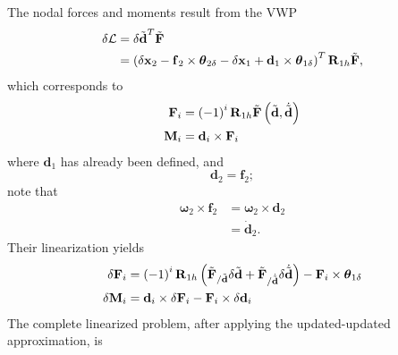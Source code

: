 \documentclass[10pt,dvips,fleqn,subeqn]{report}
\newcommand{\T}[1]{\bm{\mathbf{#1}}}
\begin{document}
The nodal forces and moments result from the VWP
\begin{align}
	\delta\mathcal{L}
	&= \delta \tilde{\T{d}}^T \tilde{\T{F}} \nonumber \\
	&= \plbr{
		\delta{\T{x}}_2
		- \T{f}_2\times\T{\theta}_{2\delta}
		- \delta{\T{x}}_1
		+ \T{d}_1\times\T{\theta}_{1\delta}
	}^T \T{R}_{1h} \tilde{\T{F}} ,
\end{align}
which corresponds to
\begin{subequations}
\begin{align}
	\T{F}_i &= \plbr{ -1 }^i \T{R}_{1h} \tilde{\T{F}}\plbr{\tilde{\T{d}}, \dot{\tilde{\T{d}}}} \\
	\T{M}_i &= \T{d}_i \times \T{F}_i
\end{align}
\end{subequations}
where $\T{d}_1$ has already been defined, and
\begin{equation}
	\T{d}_2 = \T{f}_2 ;
\end{equation}
note that
\begin{align}
	\T{\omega}_2\times\T{f}_2
	&= \T{\omega}_2\times\T{d}_2 \nonumber \\
	&= \dot{\T{d}}_2 .
\end{align}
Their linearization yields
\begin{subequations}
\begin{align}
	\delta\T{F}_i
	&= \plbr{ -1 }^i \T{R}_{1h} \plbr{
		\tilde{\T{F}}_{/\tilde{\T{d}}} \delta{\tilde{\T{d}}}
		+ \tilde{\T{F}}_{/\dot{\tilde{\T{d}}}} \delta\dot{\tilde{\T{d}}}
	} - \T{F}_i \times \T{\theta}_{1\delta} \\
	\delta\T{M}_i
	&= \T{d}_i \times \delta\T{F}_i
	- \T{F}_i \times \delta \T{d}_i
\end{align}
\end{subequations}
The complete linearized problem, after applying the updated-updated 
approximation, is
\end{document}
